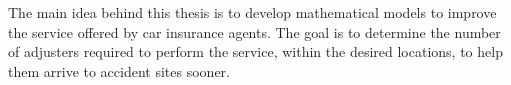The main idea behind this thesis
is to develop mathematical models
to improve the service offered by car insurance agents.
The goal
is to determine
the number of adjusters required
to perform the service,
within the desired locations,
to help them arrive to accident sites sooner.
